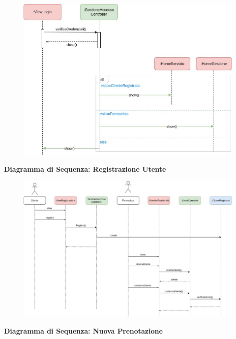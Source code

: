 \begin{figure}[h!]
    \begin{center}
        \includegraphics[scale=0.5]{immagini/Interazione-LoginUtente.jpg}
    \end{center}
\end{figure}
\hfill \break

\textbf{Diagramma di Sequenza: Registrazione Utente}

\begin{figure}[h!]
    \begin{center}
        \includegraphics[scale=0.4]{immagini/Interazione-RegistrazioneUtente.jpg}
    \end{center}
\end{figure}
\hfill \break

\textbf{Diagramma di Sequenza: Nuova Prenotazione}


